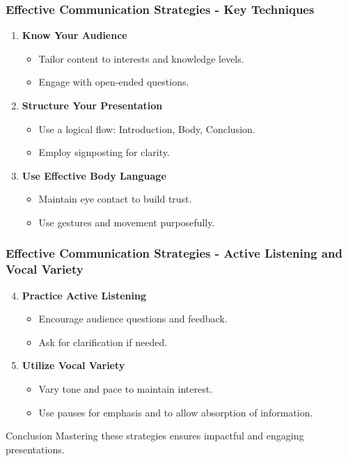 \documentclass[aspectratio=169]{beamer}
\begin{document}
\begin{frame}[fragile]
    \frametitle{Effective Communication Strategies - Key Techniques}
    \begin{enumerate}
        \item \textbf{Know Your Audience}
            \begin{itemize}
                \item Tailor content to interests and knowledge levels.
                \item Engage with open-ended questions.
            \end{itemize}
            
        \item \textbf{Structure Your Presentation}
            \begin{itemize}
                \item Use a logical flow: Introduction, Body, Conclusion.
                \item Employ signposting for clarity.
            \end{itemize}
            
        \item \textbf{Use Effective Body Language}
            \begin{itemize}
                \item Maintain eye contact to build trust.
                \item Use gestures and movement purposefully.
            \end{itemize}
    \end{enumerate}
\end{frame}

\begin{frame}[fragile]
    \frametitle{Effective Communication Strategies - Active Listening and Vocal Variety}
    \begin{enumerate}
        \setcounter{enumi}{3}
        \item \textbf{Practice Active Listening}
            \begin{itemize}
                \item Encourage audience questions and feedback.
                \item Ask for clarification if needed.
            \end{itemize}
            
        \item \textbf{Utilize Vocal Variety}
            \begin{itemize}
                \item Vary tone and pace to maintain interest.
                \item Use pauses for emphasis and to allow absorption of information.
            \end{itemize}
    \end{enumerate}
    
    \begin{block}{Conclusion}
        Mastering these strategies ensures impactful and engaging presentations.
    \end{block}
\end{frame}
\end{document}

